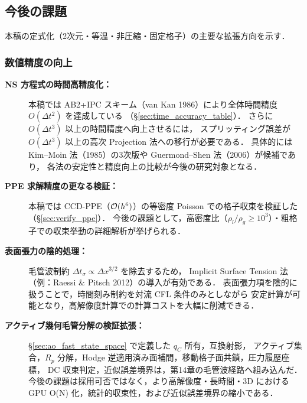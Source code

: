 \subsection{今後の課題}
\label{sec:future_work}

本稿の定式化（2次元・等温・非圧縮・固定格子）の主要な拡張方向を示す．

\subsubsection{数値精度の向上}

\begin{description}
  \item[\textbf{NS 方程式の時間高精度化：}]
        本稿では AB2+IPC スキーム（van Kan 1986）により全体時間精度 $O(\Delta t^2)$ を達成している
        （§\ref{sec:time_accuracy_table}）．
        さらに $O(\Delta t^3)$ 以上の時間精度へ向上させるには，
        スプリッティング誤差が $O(\Delta t^3)$ 以上の高次 Projection 法への移行が必要である．
        具体的には Kim--Moin 法（1985）の3次版や Guermond--Shen 法（2006）が候補であり，
        各法の安定性と精度向上の比較が今後の研究対象となる．

  \item[\textbf{PPE 求解精度の更なる検証：}]
        本稿では CCD-PPE（$\mathcal{O}(h^6)$）の等密度 Poisson での格子収束を検証した（§\ref{sec:verify_ppe}）．
        今後の課題として，高密度比（$\rho_l/\rho_g \geq 10^3$）・粗格子での収束挙動の詳細解析が挙げられる．

  \item[\textbf{表面張力の陰的処理：}]
        毛管波制約 $\Delta t_\sigma \propto \Delta x^{3/2}$ を除去するため，
        Implicit Surface Tension 法（例：Raessi \& Pitsch 2012）の導入が有効である．
        表面張力項を陰的に扱うことで，時間刻み制約を対流 CFL 条件のみとしながら
        安定計算が可能となり，高解像度計算での計算コストを大幅に削減できる．

  \item[\textbf{アクティブ幾何毛管分解の検証拡張：}]
        §\ref{sec:ao_fast_state_space} で定義した $q_C$ 所有，互換射影，
        アクティブ集合，$R_p$ 分解，Hodge 逆適用済み面補間，移動格子面共鎖，圧力履歴座標，
        DC 収束判定，近似誤差境界は，第14章の毛管波経路へ組み込んだ．
        今後の課題は採用可否ではなく，より高解像度・長時間・3D における
        GPU O(N) 化，統計的収束性，および近似誤差境界の縮小である．


\end{description}
